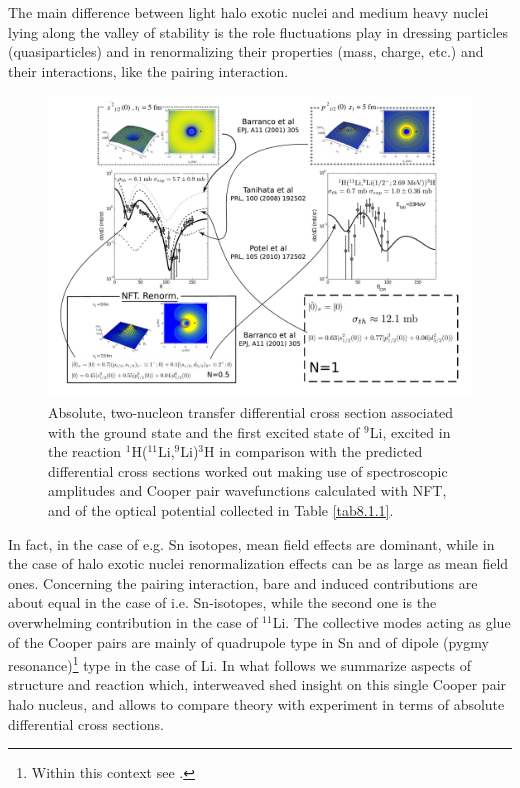  
  The main difference between light halo exotic nuclei and medium heavy  nuclei lying along the valley of stability is the role fluctuations play in dressing particles (quasiparticles) and in renormalizing their properties (mass, charge, etc.) and their interactions, like the pairing interaction.
  \begin{figure}
  \centerline{\includegraphics*[width=18cm,angle=0]{C8/figsC8/fig8_1_3}}
  	\caption{Absolute, two-nucleon transfer differential cross section associated with the ground state and the first 	excited state of $^9$Li, excited  in the reaction $^1$H($^{11}$Li,$^9$Li)$^3$H \citep{Tanihata:08} in comparison with the predicted differential cross sections \citep{Potel:10} worked out making use of spectroscopic amplitudes and Cooper pair wavefunctions calculated with NFT, and of the optical potential collected in Table \ref{tab8.1.1}.}\label{fig8_1_2}
  \end{figure}
 In fact, in the case of e.g. Sn isotopes, mean field effects are dominant, while in the case of halo exotic nuclei renormalization effects can be as large as mean field ones. Concerning the pairing interaction, bare and induced contributions are about equal in the case of i.e. Sn-isotopes, while the second one is the overwhelming contribution in the case of $^{11}$Li. The collective modes acting as glue of the Cooper pairs are mainly of quadrupole type in Sn and of dipole (pygmy resonance)\footnote{Within this context see \cite{Broglia:19}.} type in the case of Li. In what follows we summarize aspects of structure and reaction which, interweaved shed insight on this single Cooper pair halo nucleus, and allows to compare theory with experiment in terms of absolute differential cross sections.

